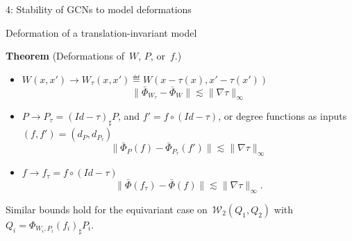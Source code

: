 \documentclass[final,dvipsnames]{beamer}
\newcommand{\vsp}{\vspace{10pt}}
\newcommand{\mycolback}[1]{
\hspace*{.01\linewidth}\begin{minipage}{.96\linewidth}
\begin{mdframed}[backgroundcolor=blue!10,linewidth=0pt]
\vsp
#1
\vsp
\end{mdframed}
\end{minipage}
}
\begin{document}
\begin{frame}{}
\begin{columns}[t]
\begin{column}{0.29\linewidth}
\begin{myalertblock}{4: Stability of GCNs to model deformations}
\begin{minipage}{.96\linewidth}
\begin{mynotablock}{Deformation of a translation-invariant model}
\vspace{0.5cm}
\mycolback{
  \textbf{Theorem} (Deformations of~$W$, $P$, or~$f$.)
  \begin{itemize}
  \item $W(x, x') \to W_\tau(x, x') \eqdef W(x - \tau(x), x' - \tau(x'))$
  \[\|\bar \Phi_{W_\tau} - \bar \Phi_{W}\| \lesssim \|\nabla \tau\|_\infty\]
  \item $P \to P_\tau = (Id-\tau)_\sharp P$, and $f' = f \circ (Id- \tau)$, or degree functions as inputs $(f, f') = (d_P, d_{P_\tau})$
  \[\|\bar \Phi_{P}(f) - \bar \Phi_{P_\tau}(f')\| \lesssim \|\nabla \tau\|_\infty\]
  \item $f \to f_\tau = f \circ (Id-\tau)$
  \[\|\bar \Phi(f_\tau) - \bar \Phi(f)\| \lesssim \|\nabla \tau\|_\infty.\]
  \end{itemize}
  Similar bounds hold for the equivariant case on~$\mathcal W_2(Q_1, Q_2)$ with $Q_i = \Phi_{W_i,P_i}(f_i)_\sharp P_i$.
}
\end{mynotablock}
\end{minipage}


\end{myalertblock}
\end{column}
\end{columns}
\end{frame}
\end{document}
